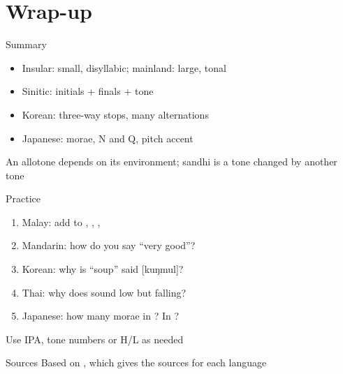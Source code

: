 \documentclass{beamer}
\begin{document}
\section{Wrap-up}

\begin{frame}{Summary}
  \Large
  \begin{itemize}
  \item Insular: small, disyllabic; mainland: large, tonal
  \item Sinitic: initials + finals + tone
  \item Korean: three-way stops, many alternations
  \item Japanese: morae, N and Q, pitch accent
  \end{itemize}
  \vfill
  \normalsize
  An allotone depends on its environment; sandhi is a tone changed by
  another tone
\end{frame}

\begin{frame}{Practice}
  \large
  \begin{enumerate}
  \item Malay: add  to , , ,
  \item Mandarin: how do you say   ``very good''?
  \item Korean: why is   ``soup'' said [kuŋmul]?
  \item Thai: why does  sound low but  falling?
  \item Japanese: how many morae in ? In ?
  \end{enumerate}
  \vfill
  \normalsize
  Use IPA, tone numbers or H/L as needed
\end{frame}

\begin{frame}{Sources}
  \large
  Based on \citet[Chapter 5]{goddard:2005}, which gives the sources for
  each language
  \vfill
  \small
  
  
\end{frame}
\end{document}
